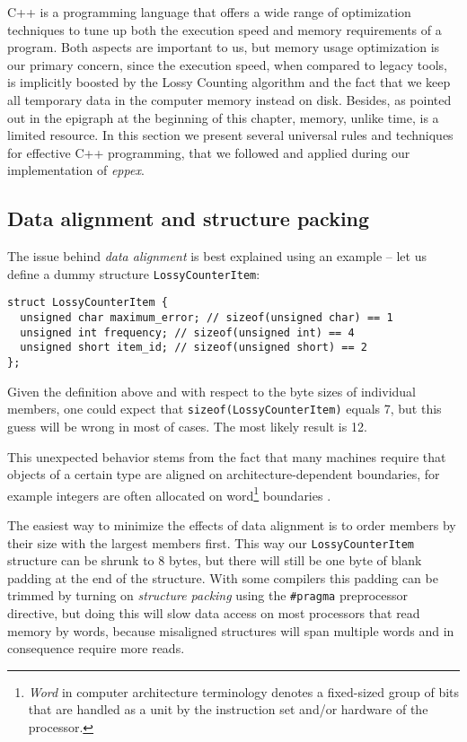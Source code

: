 C++ is a programming language that offers a wide range of optimization techniques to
tune up both the execution speed and memory requirements of a program.
Both aspects are important to us, but memory usage optimization is our primary concern,
since the execution speed, when compared to legacy tools, is implicitly boosted by
the Lossy Counting algorithm and the fact that we keep all temporary data in the computer
memory instead on disk.
Besides, as pointed out in the epigraph at the beginning of this chapter, memory, unlike time,
is a limited resource.
In this section we present several universal rules and techniques for effective C++
programming, that we followed and applied during our implementation of \emph{eppex}.

\subsection{Data alignment and structure packing}

The issue behind \emph{data alignment} is best explained using an example
-- let us define a dummy structure \texttt{LossyCounterItem}:

\begin{verbatim}
struct LossyCounterItem {
  unsigned char maximum_error; // sizeof(unsigned char) == 1
  unsigned int frequency; // sizeof(unsigned int) == 4
  unsigned short item_id; // sizeof(unsigned short) == 2
};
\end{verbatim}

Given the definition above and with respect to the byte sizes of individual members,
one could expect that \texttt{sizeof(LossyCounterItem)} equals 7, but this guess
will be wrong in most of cases. The most likely result is 12.

This unexpected behavior stems from the fact that many machines require that
objects of a certain type are aligned on architecture-dependent boundaries,
for example integers are often allocated on word\footnote{\emph{Word} in computer
architecture terminology denotes a fixed-sized group of bits that are handled
as a unit by the instruction  set and/or hardware of the processor.} boundaries
\citep[Chapter 5]{stroustrup:cplusplus}.

The easiest way to minimize the effects of data alignment is to order members
by their size with the largest members first.
This way our \texttt{LossyCounterItem} structure can be shrunk to 8 bytes,
but there will still be one byte of blank padding at the end of the structure.
With some compilers this padding can be trimmed by turning on \emph{structure packing}
using the \texttt{\#pragma} preprocessor directive, but doing this will slow data access
on most processors that read memory by words, because misaligned structures will span
multiple words and in consequence require more reads.

